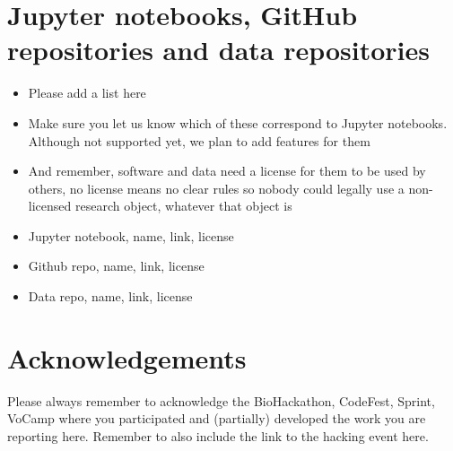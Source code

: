 \documentclass[a4paper,10pt]{article}
\begin{document}
\section{Jupyter notebooks, GitHub repositories and data
repositories}\label{jupyter-notebooks-github-repositories-and-data-repositories}

\begin{itemize}
\item
  Please add a list here
\item
  Make sure you let us know which of these correspond to Jupyter
  notebooks. Although not supported yet, we plan to add features for
  them
\item
  And remember, software and data need a license for them to be used by
  others, no license means no clear rules so nobody could legally use a
  non-licensed research object, whatever that object is
\item
  Jupyter notebook, name, link, license
\item
  Github repo, name, link, license
\item
  Data repo, name, link, license
\end{itemize}

\section{Acknowledgements}\label{Acknowledgements}
Please always remember to acknowledge the BioHackathon, CodeFest, Sprint, VoCamp where you participated and (partially) developed the work you are reporting here. Remember to also include the link to the hacking event here.

\medskip



\end{document}
